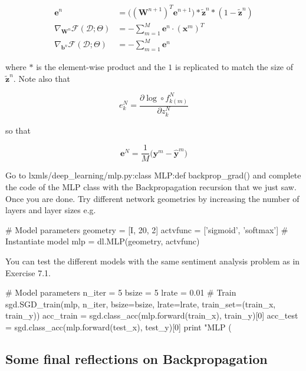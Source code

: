 \begin{align}
\mathbf{e}^{n} & = \Big((\mathbf{W}^{n+1})^T \mathbf{e}^{n+1}\Big) \ast \tilde{\mathbf{z}}^n \ast (1-\tilde{\mathbf{z}}^n)\\
\nabla_{\mathbf{W}^n}\mathcal{F}(\mathcal{D};\Theta) & = -\sum_{m=1}^M \mathbf{e}^{n} \cdot \left(\mathbf{x}^m\right)^T \\ 
\nabla_{\mathbf{b}^n}\mathcal{F}(\mathcal{D};\Theta) & = -\sum_{m=1}^M \mathbf{e}^{n}  
\end{align}

\noindent where $\ast$ is the element-wise product and the $1$ is replicated to
match the size of $\tilde{\mathbf{z}}^n$. Note also that 

\begin{equation}
e^N_k = \frac{\partial \log \circ f_{k(m)}^N}{\partial z^{N}_{k}}  
\label{eq:finalError}
\end{equation}

\noindent so that

\begin{equation}
\mathbf{e}^N =\frac{1}{M}\Big(\mathbf{y}^m - \hat{\mathbf{y}}^m \Big)  
\end{equation}

\begin{exercise}
Go to lxmls/deep\_learning/mlp.py:class MLP:def backprop\_grad() and complete
the code of the MLP class with the Backpropagation recursion that we just saw.
Once you are done. Try different network geometries by increasing the number of
layers and layer sizes e.g.
\begin{python}
# Model parameters
geometry = [I, 20, 2]
actvfunc = ['sigmoid', 'softmax'] 
# Instantiate model
mlp      = dl.MLP(geometry, actvfunc) 
\end{python}
You can test the different models with the same sentiment analysis problem as
in Exercise 7.1. 
\begin{python}
# Model parameters
n_iter = 5
bsize  = 5
lrate  = 0.01
# Train
sgd.SGD_train(mlp, n_iter, bsize=bsize, lrate=lrate, train_set=(train_x, train_y))
acc_train = sgd.class_acc(mlp.forward(train_x), train_y)[0]
acc_test  = sgd.class_acc(mlp.forward(test_x), test_y)[0]
print "MLP (%
\end{python}
\end{exercise}

\subsection{Some final reflections on Backpropagation}

